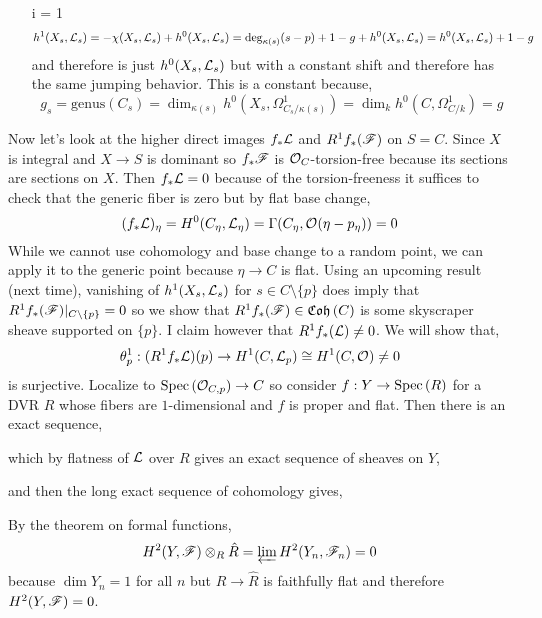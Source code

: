 \documentclass[12pt]{article}
\begin{document}
\begin{example}
\begin{enumerate}
\item[i = 1]
\[ h^1(X_s, \mathcal{L}_s) = - \chi(X_s, \mathcal{L}_s) + h^0(X_s, \mathcal{L}_s) = \deg_{\kappa(s)} (s - p) + 1 - g + h^0(X_s, \mathcal{L}_s) = h^0(X_s, \mathcal{L}_s) + 1 - g \]
and therefore is just $h^0(X_s, \mathcal{L}_s)$ but with a constant shift and therefore has the same jumping behavior. This is a constant because,
\[ g_s = \text{genus}(C_s) = \dim_{\kappa(s)} h^0(X_s, \Omega^1_{C_s /\kappa(s)}) = \dim_k h^0(C, \Omega^1_{C/k}) = g \]
\end{enumerate} 
Now let's look at the higher direct images $f_* \mathcal{L}$ and $R^1 f_*(\mathscr{F})$ on $S = C$. Since $X$ is integral and $X \to S$ is dominant so $f_* \mathscr{F}$ is $\mathcal{O}_{C}$-torsion-free because its sections are sections on $X$. Then $f_* \mathcal{L} = 0$ because of the torsion-freeness it suffices to check that the generic fiber is zero but by flat base change,
\[ (f_* \mathcal{L})_\eta = H^0(C_\eta, \mathcal{L}_\eta) = \Gamma(C_\eta, \mathcal{O}_{}(\eta - p_\eta)) = 0 \]
While we cannot use cohomology and base change to a random point, we can apply it to the generic point because $\eta \to C$ is flat. Using an upcoming result (next time), vanishing of $h^1(X_s, \mathcal{L}_s)$ for $s \in C \setminus \{ p \}$ does imply that $R^1 f_* (\mathscr{F}) |_{C \setminus \{ p \}} = 0$ so we show that $R^1 f_* (\mathscr{F}) \in \mathfrak{Coh}\left(C\right)$ is some skyscraper sheave supported on $\{ p \}$. I claim however that $R^1 f_* (\mathcal{L}) \neq 0$. We will show that,
\[ \theta^1_p : (R^1 f_* \mathcal{L})(p) \to H^1(C, \mathcal{L}_p) \cong H^1(C, \mathcal{O}_{}) \neq 0 \]
is surjective. Localize to $\mathrm{Spec}\left( \mathcal{O}_{C, p} \right) \to C$ so consider $f : Y \to \mathrm{Spec}\left( R \right)$ for a DVR $R$ whose fibers are $1$-dimensional and $f$ is proper and flat. Then there is an exact sequence,
\begin{center}
\end{center}
which by flatness of $\mathcal{L}$ over $R$ gives an exact sequence of sheaves on $Y$,
\begin{center}
\end{center}
and then the long exact sequence of cohomology gives,
\begin{center}
\end{center}
By the theorem on formal functions,
\[ H^2(Y, \mathscr{F}) \otimes_R \hat{R} = \varprojlim H^2(Y_n, \mathscr{F}_n) = 0 \]
because $\dim{Y_n} = 1$ for all $n$ but $R \to \hat{R}$ is faithfully flat and therefore $H^2(Y, \mathscr{F}) = 0$. 
\end{example}
\end{document}
